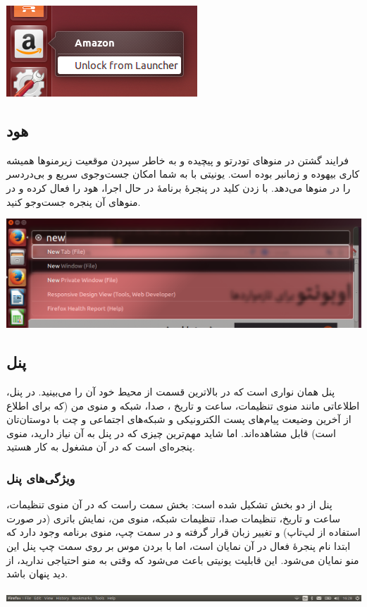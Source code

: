 \begin{center}
\includegraphics[scale=0.5]{pics/15.png}
\end{center}

\subsection{هود}
فرایند گشتن در منوهای تودرتو و پیچیده و به خاطر سپردن موقعیت زیرمنوها همیشه کاری بیهوده و زمانبر بوده است. یونیتی با  به شما امکان جست‌و‌جوی سریع و بی‌دردسر را در منوها می‌دهد. با زدن کلید  در پنجرهٔ برنامهٔ در حال اجرا، هود را فعال کرده و در منوهای آن پنجره جست‌وجو کنید.\\
\begin{center}
\includegraphics[scale=0.5]{pics/16.png}
\end{center}

\subsection{پنل}
پنل همان نواری است که در بالاترین قسمت از محیط خود آن را می‌بینید. در پنل، اطلاعاتی مانند منوی تنظیمات، ساعت و تاریخ ، صدا، شبکه و منوی من (که برای اطلاع از آخرین وضیعت پیام‌های پست الکترونیکی و شبکه‌های اجتماعی و چت با دوستان‌تان است) قابل مشاهده‌اند. اما شاید مهم‌ترین چیزی که در پنل به آن نیاز دارید، منوی پنجره‌ای است که در آن مشغول به کار هستید.

\subsubsection{ویژگی‌های پنل}
پنل از دو بخش تشکیل شده است: بخش سمت راست که در آن منوی تنظیمات، ساعت و تاریخ، تنظیمات صدا، تنظیمات شبکه، منوی من، نمایش باتری (در صورت استفاده از لپ‌تاپ) و تغییر زبان قرار گرفته و در سمت چپ، منوی برنامه وجود دارد که ابتدا نام پنجرهٔ فعال در آن نمایان است، اما با بردن موس بر روی سمت چپ پنل این منو نمایان می‌شود. این قابلیت یونیتی باعث می‌شود که وقتی به منو احتیاجی ندارید، از دید پنهان باشد.
\begin{flushleft}
\includegraphics[scale=0.39]{pics/17.png}
\end{flushleft}


